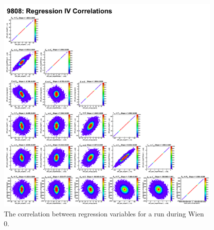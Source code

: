 \begin{singlespace}
\begin{figure}[!h]
	\begin{center}
	\includegraphics[width=15.0cm]{figures/regIV_correlationWien0}
	\end{center}
	\caption
	{The correlation between regression variables for a run during Wien 0.}
	\label{fig:regIV_correlationWien0}
\end{figure}
\end{singlespace}

